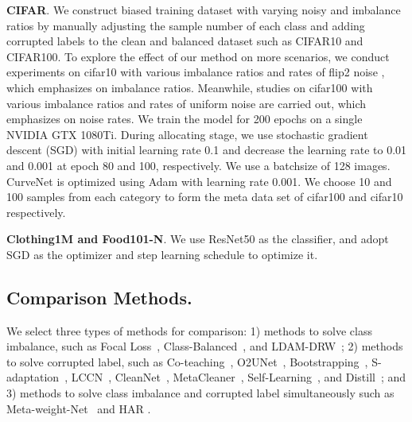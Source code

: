 \documentclass[letterpaper]{article} %
\newcommand{\bd}[1]{\textbf{#1}}
\begin{document}
\noindent\bd{CIFAR}. We construct biased training dataset with varying noisy and imbalance ratios by manually adjusting the sample number of each class and adding corrupted labels to the clean and balanced dataset such as CIFAR10 and CIFAR100.
{To explore the effect of our method on more scenarios, we conduct experiments on cifar10 with various imbalance ratios and rates of flip2 noise , which emphasizes on imbalance ratios.
Meanwhile, studies on cifar100 with various imbalance ratios and rates of uniform noise  are carried out, which emphasizes on noise rates.}
We train the model for 200 epochs on a single NVIDIA GTX 1080Ti. 
During allocating stage, we use stochastic gradient descent (SGD) with initial learning rate 0.1 and decrease the learning rate to 0.01 and 0.001 at epoch 80 and 100, respectively. 
We use a batchsize of 128 images. CurveNet is optimized using Adam with learning rate 0.001.
We choose 10 and 100 samples from each category to form the meta data set of cifar100 and cifar10 respectively. 

\noindent\bd{Clothing1M and Food101-N}. 
We use ResNet50 as the classifier, and adopt SGD as the optimizer and step learning schedule to optimize it.

\subsection{Comparison Methods.} 
We select three types of methods for comparison: 1) methods to solve class imbalance, such as Focal Loss~\cite{lin2017focal}, Class-Balanced~\cite{cui2019class},  and LDAM-DRW~\cite{cao2019learning}; 2) methods to solve corrupted label, such as Co-teaching~\cite{han2018co}, O2UNet~\cite{huang2019o2u}, Bootstrapping~\cite{reed2014training}, S-adaptation~\cite{goldberger2016training}, LCCN~\cite{li2019learning}, CleanNet~\cite{lee2018cleannet}, MetaCleaner~\cite{zhang2019metacleaner}, Self-Learning~\cite{han2019deep}, and Distill~\cite{zhang2020distilling}; and 3) methods to solve class imbalance and corrupted label simultaneously such as Meta-weight-Net~\cite{shu2019meta} and HAR \cite{cao2020heteroskedastic}. 
\end{document}
